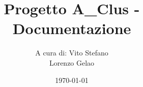
\newcommand{\Titolo}{Progetto A\_Clus - Documentazione}
\newcommand{\Data}{\today}
\newcommand{\Materia}{}


\newcommand{\image}[3]{%
    \begin{figure}[h!]
    \centering
    \texttt{[image: \#1]}
    \caption{#2}
    \label{#3}%
\end{figure}}


\documentclass[a4paper]{article}
\usepackage{amsmath}
\usepackage{amssymb}


\usepackage[italian]{babel}


\usepackage{fancyvrb}
\usepackage{fancyhdr, lastpage}


\usepackage{cancel}
\usepackage{etoolbox}
\usepackage{xcolor}
\usepackage{subfig}
\usepackage{tikz, lmodern}
\usepackage[T1]{fontenc}
\usepackage[most]{tcolorbox}
\usepackage{graphicx}
\usepackage{hyperref}
\usepackage{parskip}
\usepackage{multicol}
\pagestyle{fancy}



\lhead{\Data}
\lfoot{\Materia}
\renewcommand{\footrulewidth}{0.5pt}
\fancyfoot[C]{}
\patchcmd{\chapter}{\thispagestyle{plain}}{\thispagestyle{fancy}}{}


\title{\Titolo}
\author{
    A cura di: 
    Vito Stefano \\ Lorenzo Gelao
}
\date{\Data}




\maketitle
\newpage
\tableofcontents
\newpage

